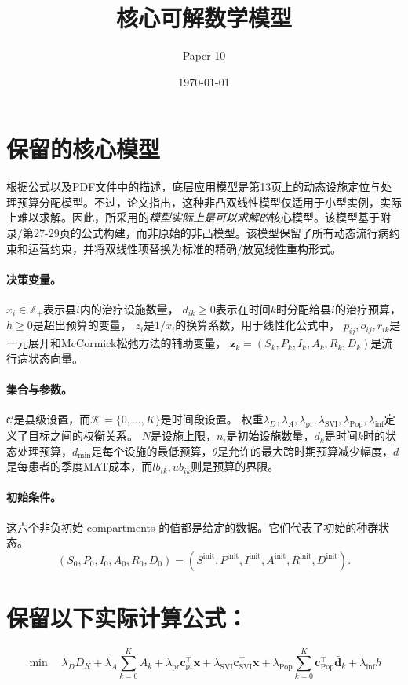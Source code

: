 \documentclass{article}
\title{核心可解数学模型}
\author{Paper 10}
\date{\today}
\begin{document}
\maketitle

\section*{保留的核心模型}
根据\texttt{}公式以及PDF文件中的描述，底层应用模型是第13页上的动态设施定位与处理预算分配模型。不过，论文指出，这种非凸双线性模型仅适用于小型实例，实际上难以求解。因此，所采用的\emph{模型实际上是可以求解的}核心模型。该模型基于附录/第27-29页的公式构建，而非原始的非凸模型。该模型保留了所有动态流行病约束和运营约束，并将双线性项替换为标准的精确/放宽线性重构形式。

\paragraph{决策变量。}
$x_i \in \mathbb Z_+$表示县$i$内的治疗设施数量，  
$d_{ik}\ge 0$表示在时间$k$时分配给县$i$的治疗预算，  
$h \ge 0$是超出预算的变量，  
$z_i$是$1/x_i$的换算系数，用于线性化公式中，  
$p_{ij},o_{ij},r_{ik}$是一元展开和McCormick松弛方法的辅助变量，  
$\mathbf z_k=(S_k,P_k,I_k,A_k,R_k,D_k)$是流行病状态向量。

\paragraph{集合与参数。}
$\mathcal C$是县级设置，而$\mathcal K=\{0,\dots,K\}$是时间段设置。  
权重$\lambda_D,\lambda_A,\lambda_{\mathrm{pr}},\lambda_{\mathrm{SVI}},
\lambda_{\mathrm{Pop}},\lambda_{\mathrm{inf}}$定义了目标之间的权衡关系。  
$N$是设施上限，$n_i$是初始设施数量，$d_k$是时间$k$时的状态处理预算，$d_{\min}$是每个设施的最低预算，$\theta$是允许的最大跨时期预算减少幅度，$d$是每患者的季度MAT成本，而$lb_{ik},ub_{ik}$则是预算的界限。

\paragraph{初始条件。}
这六个非负初始 compartments 的值都是给定的数据。它们代表了初始的种群状态。
\[
(S_0,P_0,I_0,A_0,R_0,D_0)
 = (S^{\mathrm{init}},P^{\mathrm{init}},I^{\mathrm{init}},
A^{\mathrm{init}},R^{\mathrm{init}},D^{\mathrm{init}}).
\]
\section*{保留以下实际计算公式：}
\begin{equation}
\min \quad
\lambda_D D_K
+ \lambda_A \sum_{k=0}^{K} A_k
+ \lambda_{\mathrm{pr}} \mathbf c_{\mathrm{pr}}^\top \mathbf x
+ \lambda_{\mathrm{SVI}} \mathbf c_{\mathrm{SVI}}^\top \mathbf x
+ \lambda_{\mathrm{Pop}} \sum_{k=0}^{K} \mathbf c_{\mathrm{Pop}}^\top \bar{\mathbf d}_k
+ \lambda_{\mathrm{inf}} h
\tag{Prac-Obj}
\end{equation}
\end{document}
